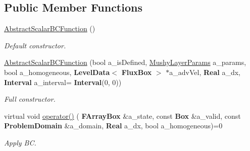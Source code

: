\subsection*{Public Member Functions}
\begin{DoxyCompactItemize}
\item 
\mbox{\label{class_abstract_scalar_b_c_function_ab17ecb34f1501f360d72fb3c2eb6d8a6}} 
\hyperlink{class_abstract_scalar_b_c_function_ab17ecb34f1501f360d72fb3c2eb6d8a6}{Abstract\+Scalar\+B\+C\+Function} ()
\begin{DoxyCompactList}\small\item\em Default constructor. \end{DoxyCompactList}\item 
\mbox{\label{class_abstract_scalar_b_c_function_ac391d3f5c821d7a7779b46388e89c221}} 
\hyperlink{class_abstract_scalar_b_c_function_ac391d3f5c821d7a7779b46388e89c221}{Abstract\+Scalar\+B\+C\+Function} (bool a\+\_\+is\+Defined, \hyperlink{class_mushy_layer_params}{Mushy\+Layer\+Params} a\+\_\+params, bool a\+\_\+homogeneous, \textbf{ Level\+Data}$<$ \textbf{ Flux\+Box} $>$ $\ast$a\+\_\+adv\+Vel, \textbf{ Real} a\+\_\+dx, \textbf{ Interval} a\+\_\+interval=\textbf{ Interval}(0, 0))
\begin{DoxyCompactList}\small\item\em Full constructor. \end{DoxyCompactList}\item 
\mbox{\label{class_abstract_scalar_b_c_function_a75298a4ff4835ee01361711eb73ea3ae}} 
virtual void \hyperlink{class_abstract_scalar_b_c_function_a75298a4ff4835ee01361711eb73ea3ae}{operator()} (\textbf{ F\+Array\+Box} \&a\+\_\+state, const \textbf{ Box} \&a\+\_\+valid, const \textbf{ Problem\+Domain} \&a\+\_\+domain, \textbf{ Real} a\+\_\+dx, bool a\+\_\+homogeneous)=0
\begin{DoxyCompactList}\small\item\em Apply BC. \end{DoxyCompactList}\end{DoxyCompactItemize}
